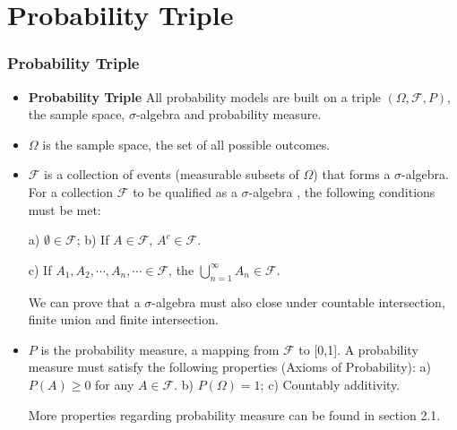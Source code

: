 \documentclass[handout]{beamer}
\begin{document}
\section{Probability Triple}
\frame
{
  \frametitle{Probability Triple}

   \begin{itemize}

      
       \item<1->\textbf{Probability Triple}  All probability models are built on a triple $(\Omega,\mathcal{F}, P)$, the sample space, $\sigma$-algebra and probability measure. 
       
       
             \item<2-> $\Omega$ is the sample space, the set of all possible outcomes. 
             \item<3-> $\mathcal{F}$ is a collection of events (measurable subsets of $\Omega$) that forms a $\sigma$-algebra. For a collection $\mathcal{F}$ to be qualified as a  $\sigma$-algebra , the following conditions must be met: 
            
            a) $\emptyset \in \mathcal{F}$;      b) If $A \in \mathcal{F}$, $A^c\in \mathcal{F}$.
            
            c) If $A_1, A_2,\cdots, A_n,\cdots \in \mathcal{F}$, the $\bigcup_{n=1}^{\infty} A_n \in \mathcal{F}$.
            
             We can prove that a $\sigma$-algebra must also close under countable intersection, finite union and finite intersection. 
             
              \item<4-> $P$ is the probability measure, a mapping from $\mathcal{F}$ to [0,1]. A probability measure must satisfy the following properties (Axioms of Probability): a)  $P(A)\geq 0$ for any $A\in \mathcal{F}$. b) $P(\Omega)=1$; c) Countably additivity. 
              
              More properties regarding probability measure can be found in section 2.1. 
                \end{itemize}
}
\end{document}

